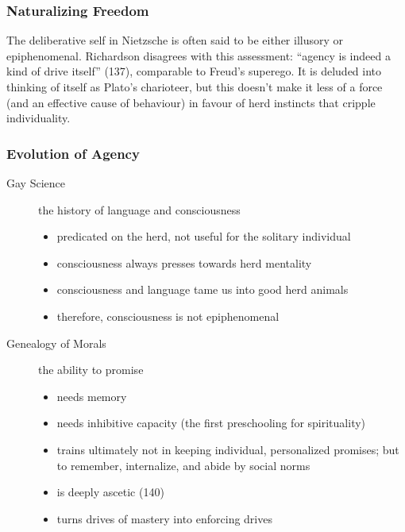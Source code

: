 \documentclass[xcolor=dvipsnames]{beamer}
\begin{document}
\begin{frame}
  \frametitle{Naturalizing Freedom}
  The deliberative self in Nietzsche is often said to be either
  illusory or epiphenomenal. Richardson disagrees with this
  assessment: ``agency is indeed a kind of drive itself'' (137),
  comparable to Freud's superego. It is deluded into thinking of
  itself as Plato's charioteer, but this doesn't make it less of a
  force (and an effective cause of behaviour) in favour of herd
  instincts that cripple individuality.
\end{frame}

\begin{frame}
  \frametitle{Evolution of Agency}
  \begin{description}
  \item[Gay Science] the history of language and consciousness
    \begin{itemize}
    \item predicated on the herd, not useful for the solitary
    individual
  \item consciousness always presses towards herd mentality
  \item consciousness and language tame us into good herd animals
  \item therefore, consciousness is not epiphenomenal
    \end{itemize}
  \item[Genealogy of Morals] the ability to promise
    \begin{itemize}
    \item needs memory
    \item needs inhibitive capacity (the first preschooling for
      spirituality)
    \item trains ultimately not in keeping individual, personalized
      promises; but to remember, internalize, and abide by social
      norms
    \item is deeply ascetic (140)
    \item turns drives of mastery into enforcing drives
    \end{itemize}
  \end{description}
\end{frame}
\end{document}
